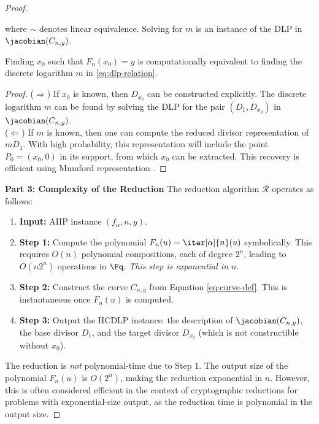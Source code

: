 \begin{proof}
\begin{enumerate}
                        where \(\sim\) denotes linear equivalence. Solving for \(m\) is an instance of the DLP in \(\jacobian(C_{n,y})\).
                \end{enumerate}
                \begin{lemma}\label{lemma:reduction}
                    Finding \(x_0\) such that \(F_n(x_0) = y\) is computationally equivalent to finding the discrete logarithm \(m\) in \eqref{eq:dlp-relation}.
                \end{lemma}
                \begin{proof}
                    (\(\Rightarrow\)) If \(x_0\) is known, then \(D_{x_0}\) can be constructed explicitly. The discrete logarithm \(m\) can be found by solving the DLP for the pair \((D_1, D_{x_0})\) in \(\jacobian(C_{n,y})\). \\
                    (\(\Leftarrow\)) If \(m\) is known, then one can compute the reduced divisor representation of \(m D_1\). With high probability, this representation will include the point \(P_0 = (x_0, 0)\) in its support, from which \(x_0\) can be extracted. This recovery is efficient using Mumford representation \cite[Section 14.2]{Cohen2010}.
                \end{proof}
            \textbf{Part 3: Complexity of the Reduction}
                The reduction algorithm \(\mathcal{R}\) operates as follows:
                \begin{enumerate}
                    \item \textbf{Input:} AIIP instance \((f_\alpha, n, y)\).
                    \item \textbf{Step 1:} Compute the polynomial \(F_n(u) = \iter[\alpha]{n}(u)\) symbolically. This requires \(O(n)\) polynomial compositions, each of degree \(2^n\), leading to \(O(n 2^n)\) operations in \(\Fq\). \textit{This step is exponential in \(n\)}.
                    \item \textbf{Step 2:} Construct the curve \(C_{n,y}\) from Equation \eqref{eq:curve-def}. This is instantaneous once \(F_n(u)\) is computed.
                    \item \textbf{Step 3:} Output the HCDLP instance: the description of \(\jacobian(C_{n,y})\), the base divisor \(D_1\), and the target divisor \(D_{x_0}\) (which is not constructible without \(x_0\)).
                \end{enumerate}
                The reduction is \textit{not} polynomial-time due to Step 1. The output size of the polynomial \(F_n(u)\) is \(O(2^n)\), making the reduction exponential in \(n\). However, this is often considered efficient in the context of cryptographic reductions for problems with exponential-size output, as the reduction time is polynomial in the output size.

\end{proof}
